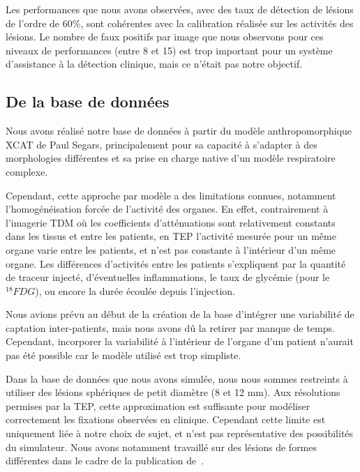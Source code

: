 Les performances que nous avons observées, avec des taux de détection de lésions
de l'ordre de 60\%, sont cohérentes avec la calibration réalisée sur les
activités des lésions. Le nombre de faux positifs par image que nous observons
pour ces niveaux de performances (entre 8 et 15) est trop important pour un
système d'assistance à la détection clinique, mais ce n'était pas notre
objectif.
 

\subsection{De la base de données}

Nous avons réalisé notre base de données à partir du modèle anthropomorphique
XCAT de Paul Segars, principalement pour sa capacité à s'adapter à des
morphologies différentes et sa prise en charge native d'un modèle respiratoire
complexe. 

Cependant, cette approche par modèle a des limitations connues, notamment
l'homogénéisation forcée de l'activité des organes. En effet, contrairement à
l'imagerie TDM où les coefficients d'atténuations sont relativement constants
dans les tissus et entre les patients, en TEP l'activité mesurée pour un même
organe varie entre les patients, et n'est pas constante à l'intérieur d'un même
organe. Les différences d'activités entre les patients s'expliquent par la
quantité de traceur injecté, d'éventuelles inflammations, le taux de glycémie
(pour le $^{18}FDG$), ou encore la durée écoulée depuis l'injection.  

Nous avions prévu au début de la création de la base d'intégrer une variabilité
de captation inter-patients, mais nous avons dû la retirer par manque de temps.
Cependant, incorporer la variabilité à l'intérieur de l'organe d'un patient
n'aurait pas été possible car le modèle utilisé est trop simpliste.  

Dans la base de données que nous avons simulée, nous nous sommes restreints à
utiliser des lésions sphériques de petit diamètre (8 et 12 mm). Aux résolutions
permises par la TEP, cette approximation est suffisante pour modéliser
correctement les fixations observées en clinique. Cependant cette limite est
uniquement liée à notre choix de sujet, et n'est pas représentative des
possibilités du simulateur. Nous avons notamment travaillé sur des lésions de
formes différentes dans le cadre de la publication
de~\cite{le2009incorporating}.  


